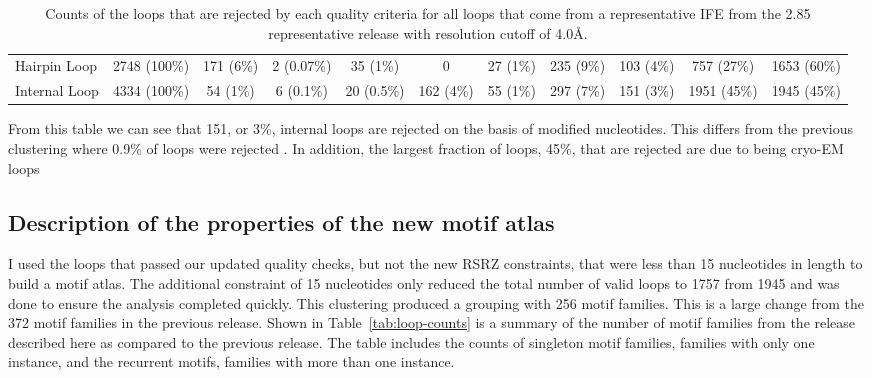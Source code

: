 \begin{table}
  \begin{tabulary}{\linewidth}{LCCCCCCCCCC}
     &
       &
       &
       &
       &
       &
       & 
       &
       &
       &
       \\
    \midrule
    Hairpin Loop & 2748 (100\%) & 171 (6\%) & 2 (0.07\%) & 35 (1\%)   & 0         & 27 (1\%) & 235 (9\%) & 103 (4\%) & 757 (27\%)  & 1653 (60\%) \\
    Internal Loop & 4334 (100\%) & 54 (1\%) & 6 (0.1\%)  & 20 (0.5\%) & 162 (4\%) & 55 (1\%) & 297 (7\%) & 151 (3\%) & 1951 (45\%) & 1945 (45\%) \\
    \bottomrule
  \end{tabulary}
  \caption{Counts of the loops that are rejected by each quality criteria for
  all loops that come from a representative IFE from the 2.85 representative
  release with resolution cutoff of 4.0{\AA}.}
  \label{tab:current-loop-quality}
\end{table}

From this table we can see that 151, or 3\%, internal loops are rejected on the
basis of modified nucleotides. This differs from the previous clustering where
0.9\% of loops were rejected \cite{Petrov2012}. In addition, the largest
fraction of loops, 45\%, that are rejected are due to being cryo-EM loops

\subsection{Description of the properties of the new motif atlas}

I used the loops that passed our updated quality checks, but not the new RSRZ
constraints, that were less than 15 nucleotides in length to build a motif
atlas. The additional constraint of 15 nucleotides only reduced the total number
of valid loops to 1757 from 1945 and was done to ensure the analysis completed
quickly. This clustering produced a grouping with 256 motif families. This is a
large change from the 372 motif families in the previous release. Shown in
Table~\ref{tab:loop-counts} is a summary of the number of motif families from
the release described here as compared to the previous release. The table
includes the counts of singleton motif families, families with only one
instance, and the recurrent motifs, families with more than one instance.

